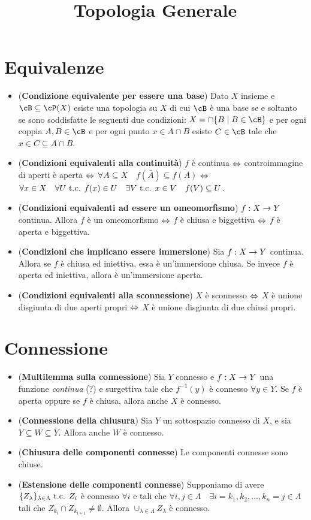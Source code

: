 \documentclass[a4paper,NoNotes,GeneralMath]{stdmdoc}
\begin{document}
	\title{Topologia Generale}
	
	\section*{Equivalenze}
	\begin{itemize}
		\item ({\bf Condizione equivalente per essere una base}) Dato $X$ insieme e $\cB \subseteq \cP (X)$ esiste una topologia su $X$ di cui $\cB$ è una base se e soltanto se sono soddisfatte le seguenti due condizioni: $X = \cap \{B \mid B \in \cB \}$ e per ogni coppia $A,B \in \cB$ e per ogni punto $x \in A \cap B$ esiste $C \in \cB$ tale che $x \in C \subseteq A \cap B$.
		\item ({\bf Condizioni equivalenti alla continuità}) $f$ è continua $\Leftrightarrow$ controimmagine di aperti è aperta $\Leftrightarrow$ $\forall A \subseteq X \quad f(\bar{A}) \subseteq \bar{f(A)}$ $\Leftrightarrow$ $\forall x \in X \quad \forall U \mbox{ t.c. } f(x) \in U \quad \exists V \mbox{ t.c. } x \in V \quad f(V) \subseteq U$.
		\item ({\bf Condizioni equivalenti ad essere un omeomorfismo}) $f: X \rightarrow Y$ continua. Allora $f$ è un omeomorfismo $\Leftrightarrow$ $f$ è chiusa e biggettiva $\Leftrightarrow$ $f$ è aperta e biggettiva.
		\item ({\bf Condizioni che implicano essere immersione}) Sia $f: X \rightarrow Y$ continua. Allora se $f$ è chiusa ed iniettiva, essa è un'immersione chiusa. Se invece $f$ è aperta ed iniettiva, allora è un'immersione aperta.
		\item ({\bf Condizioni equivalenti alla sconnessione}) $X$ è sconnesso $\Leftrightarrow$ $X$ è unione disgiunta di due aperti propri $\Leftrightarrow$ $X$ è unione disgiunta di due chiusi propri.
	\end{itemize}
	
	\section*{Connessione}
	\begin{itemize}
		\item ({\bf Multilemma sulla connessione}) Sia $Y$ connesso e $f: X \rightarrow Y$ una funzione {\it continua} (?) e surgettiva tale che $f^{-1}(y)$ è connesso $\forall y \in Y$. Se $f$ è aperta oppure se $f$ è chiusa, allora anche $X$ è connesso.
		\item ({\bf Connessione della chiusura}) Sia $Y$ un sottospazio connesso di $X$, e sia $Y \subseteq W \subseteq \bar{Y}$. Allora anche $W$ è connesso.
		\item ({\bf Chiusura delle componenti connesse}) Le componenti connesse sono chiuse.
		\item ({\bf Estensione delle componenti connesse}) Supponiamo di avere $\{Z_\lambda\}_{\lambda \in \Lambda} \mbox{ t.c. } Z_i$ è connesso $\forall i$ e tali che $\forall i, j \in \Lambda \quad \exists i=k_1, k_2, \ldots, k_n = j \in \Lambda$ tali che $Z_{k_l} \cap Z_{k_{l+1}} \neq \emptyset$. Allora $\cup_{\lambda \in \Lambda} Z_\lambda$ è connesso.
	\end{itemize}
\end{document}

